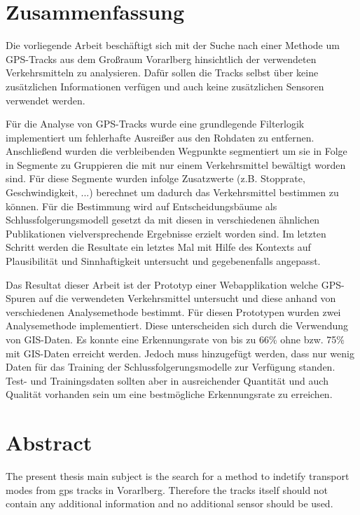 \section*{Zusammenfassung}

Die vorliegende Arbeit beschäftigt sich mit der Suche nach einer Methode um GPS-Tracks  aus dem Großraum Vorarlberg hinsichtlich der verwendeten Verkehrsmitteln zu analysieren. Dafür sollen die Tracks selbst über keine zusätzlichen Informationen verfügen und auch keine zusätzlichen Sensoren verwendet werden.

Für die Analyse von GPS-Tracks wurde eine grundlegende Filterlogik implementiert um fehlerhafte Ausreißer aus den Rohdaten zu entfernen. Anschließend wurden die verbleibenden Wegpunkte segmentiert um sie in Folge in Segmente zu Gruppieren die mit nur einem Verkehrsmittel bewältigt worden sind. Für diese Segmente wurden infolge Zusatzwerte (z.B. Stopprate, Geschwindigkeit, ...) berechnet um dadurch das Verkehrsmittel bestimmen zu können. Für die Bestimmung wird auf Entscheidungsbäume als Schlussfolgerungsmodell gesetzt da mit diesen in verschiedenen ähnlichen Publikationen vielversprechende Ergebnisse erzielt worden sind. Im letzten Schritt werden die Resultate ein letztes Mal mit Hilfe des Kontexts auf Plausibilität und Sinnhaftigkeit untersucht und gegebenenfalls angepasst.

Das Resultat dieser Arbeit ist der Prototyp einer Webapplikation welche GPS-Spuren auf die verwendeten Verkehrsmittel untersucht und diese anhand von verschiedenen Analysemethode bestimmt. Für diesen Prototypen wurden zwei Analysemethode implementiert. Diese unterscheiden sich durch die Verwendung von GIS-Daten. Es konnte eine Erkennungsrate von bis zu 66\% ohne bzw. 75\% mit GIS-Daten erreicht werden. Jedoch muss hinzugefügt werden, dass nur wenig Daten für das Training der Schlussfolgerungsmodelle zur Verfügung standen. Test- und Trainingsdaten sollten aber  in ausreichender Quantität und auch Qualität vorhanden sein um eine bestmögliche Erkennungsrate zu erreichen.

\afterpage{\blankpage}
\newpage

\section*{Abstract}

The present thesis main subject is the search for a method to indetify transport modes from gps tracks in Vorarlberg. Therefore the tracks itself should not contain any additional information and no additional sensor should be used.

